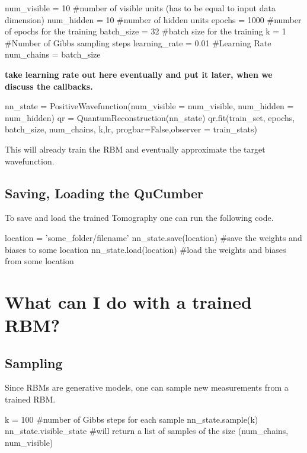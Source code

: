 \documentclass[submission, Phys]{SciPost}
\begin{document}
\begin{python}
num_visible = 10 #number of visible units (has to be equal to input data dimension)
num_hidden = 10 #number of hidden units
epochs = 1000 #number of epochs for the training
batch_size = 32 #batch size for the training
k = 1 #Number of Gibbs sampling steps
learning_rate = 0.01 #Learning Rate
num_chains = batch_size
\end{python}

\textbf{take learning rate out here eventually and put it later, when we discuss the callbacks.}

\begin{python}
nn_state = PositiveWavefunction(num_visible = num_visible,
						                    num_hidden = num_hidden)
qr = QuantumReconstruction(nn_state)
qr.fit(train_set, epochs, batch_size, num_chains, k,lr, progbar=False,observer = train_stats)
\end{python}

This will already train the RBM and eventually approximate the target wavefunction. 




\subsection{Saving, Loading the QuCumber}

To save and load the trained Tomography one can run the following code.

\begin{python}
location = 'some_folder/filename'
nn_state.save(location) #save the weights and biases to some location
nn_state.load(location) #load the weights and biases from some location
\end{python}

\section{What can I do with a trained RBM?}

\subsection{Sampling}

Since RBMs are generative models, one can sample new measurements from a trained RBM.

\begin{python}
k = 100 #number of Gibbs steps for each sample
nn_state.sample(k)
nn_state.visible_state #will return a list of samples of the size (num_chains, num_visible)
\end{python}
\end{document}
